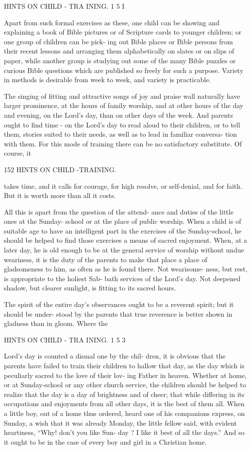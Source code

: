 \documentclass[
]{book}
\begin{document}
HINTS ON CHILD - TRA INING. 1 5 I

Apart from such formal exercises as these, one child can be showing and explaining a book of Bible pictures or of Scripture cards to younger children; or one group of children can be pick- ing out Bible places or Bible persons from their recent lessons and arranging them alphabetically on slates or on slips of paper, while another group is studying out some of the many Bible puzzles or curious Bible questions which are published so freely for such a purpose. Variety in methods is desirable from week to week, and variety is practicable.

The singing of fitting and attractive songs of joy and praise wall naturally have larger prominence, at the hours of family worship, and at other hours of the day and evening, on the Lord's day, than on other days of the week. And parents ought to find time - on the Lord's day to read aloud to their children, or to tell them, stories suited to their needs, as well as to lead in familiar conversa- tion with them. For this mode of training there can be no satisfactory substitute. Of course, it

152 HINTS ON CHILD -TRAINING.

takes time, and it calls for courage, for high resolve, or self-denial, and for faith. But it is worth more than all it costs.

All this is apart from the question of the attend- ance and duties of the little ones at the Sunday- school or at the place of public worship. When a child is of suitable age to have an intelligent part in the exercises of the Sunday-school, he should be helped to find those exercises a means of sacred enjoyment. When, at a later day, he is old enough to be at the general service of worship without undue weariness, it is the duty of the parents to make that place a place of gladsomeness to him, as often as he is found there. Not wearisome- ness, but rest, is appropriate to the holiest Sab- bath services of the Lord's day. Not deepened shadow, but clearer sunlight, is fitting to its sacred hours.

The spirit of the entire day's observances ought to be a reverent spirit; but it should be under- stood by the parents that true reverence is better shown in gladness than in gloom. Where the

HINTS ON CHILD - TRA INING. 1 5 3

Lord's day is counted a dismal one by the chil- dren, it is obvious that the parents have failed to train their children to hallow that day, as the day which is peculiarly sacred to the love of their lov- ing Father in heaven. Whether at home, or at Sunday-school or any other church service, the children should be helped to realize that the day is a day of brightness and of cheer; that while differing in its occupations and enjoyments from all other days, it is the best of them all. When a little boy, out of a home thus ordered, heard one of his companions express, on Sunday, a wish that it was already Monday, the little fellow said, with evident heartiness, ``Why! don't you like Sun- day ? I like it best of all the days.'' And so it ought to be in the case of every boy and girl in a Christian home.
\end{document}
